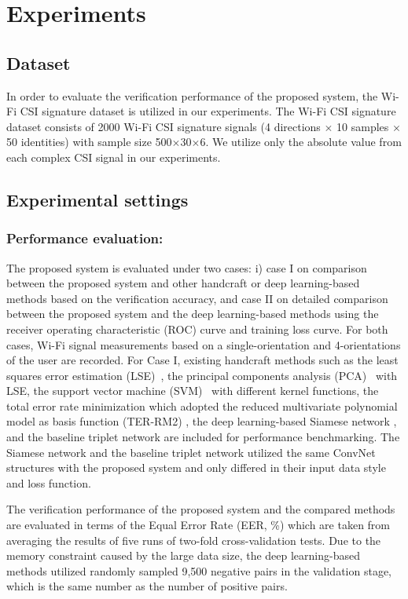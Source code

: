 \documentclass{sig-alternate-05-2015}
\begin{document}
\section{Experiments}

\subsection{Dataset}
 In order to evaluate the verification performance of the proposed system, the Wi-Fi CSI signature dataset \cite{moon2017air} is utilized in our experiments. The Wi-Fi CSI signature dataset consists of 2000 Wi-Fi CSI signature signals (4 directions $\times$ 10 samples $\times$ 50 identities) with sample size 500$\times$30$\times$6. We utilize only the absolute value from each complex CSI signal in our experiments.

\subsection{Experimental settings}

\subsubsection{Performance evaluation:}
The proposed system is evaluated under two cases: i) case I on comparison between the proposed system and other handcraft or deep learning-based methods based on the verification accuracy, and case II on detailed comparison between the proposed system and the deep learning-based methods using the receiver operating characteristic (ROC) curve and training loss curve. For both cases, Wi-Fi signal measurements based on a single-orientation and 4-orientations of the user are recorded. For Case I, existing handcraft methods such as the least squares error estimation (LSE)~\cite{duda2012pattern}, the principal components analysis (PCA)~\cite{turk1991eigenfaces} with LSE, the support vector machine (SVM)~\cite{boser1992training} with different kernel functions, the total error rate minimization which adopted the reduced multivariate polynomial model as basis function (TER-RM2) \cite{toh2008between}, the deep learning-based Siamese network \cite{koch2015siamese}, and the baseline triplet network \cite{hoffer2015deep} are included for performance benchmarking. The Siamese network and the baseline triplet network utilized the same ConvNet structures with the proposed system and only differed in their input data style and loss function.

The verification performance of the proposed system and the compared methods are evaluated in terms of the Equal Error Rate (EER, \%) which are taken from averaging the results of five runs of two-fold cross-validation tests. Due to the memory constraint caused by the large data size, the deep learning-based methods utilized randomly sampled 9,500 negative pairs in the validation stage, which is the same number as the number of positive pairs.
\end{document}
